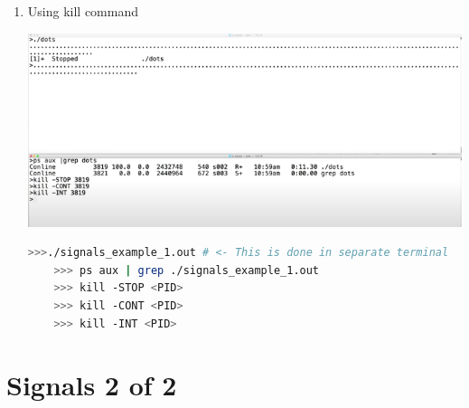 \documentclass[12pt]{article}
\begin{document}
\begin{itemize}
\begin{itemize}
\begin{enumerate}[1.]
            \item Using kill command

            \begin{center}
            \includegraphics[width=\linewidth]{images/week_9_notes_1_2.png}
            \end{center}

    \begin{lstlisting}[language=bash]
    >>>./signals_example_1.out # <- This is done in separate terminal
    >>> ps aux | grep ./signals_example_1.out
    >>> kill -STOP <PID>
    >>> kill -CONT <PID>
    >>> kill -INT <PID>
    \end{lstlisting}

        \end{enumerate}
    \end{itemize}
\end{itemize}

\bigskip

\section*{Signals 2 of 2}

\bigskip
\end{document}

